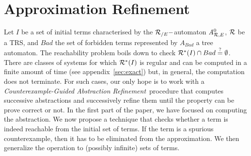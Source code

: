 \section{Approximation Refinement}
\label{sec:refinement}

Let $I$ be a set of initial terms characterised by the ${\mathcal R_{/E}}-$automaton
${\it A}_{\mathcal R,E}^0$, $\mathcal R$ be a TRS, and $Bad$ the set of forbidden terms
represented by $A_{Bad}$ a tree automaton.  The reachability problem
boils down to check $\mathcal R^*(I) \cap Bad
\stackrel{?}{=}\emptyset$. There are classes of systems for which
$\mathcal R^*(I)$ is regular and can be computed in a finite amount of time
(see appendix~\ref{sec:exact}) but, in general, the computation does
not terminate. For such cases, our only hope is to work with a
\textit{Counterexample-Guided Abstraction
  Refinement\,\cite{DBLP:conf/time/Clarke03}} procedure that computes
successive abstractions and successively refine them until the
property can be prove correct or not. In the first part of the paper,
we have focused on computing the abstraction. We now propose a
technique that checks whether a term is indeed reachable from the
initial set of terms. If the term is a spurious counterexample, then
it has to be eliminated from the approximation. We then generalize the
operation to (possibly infinite) sets of terms.








